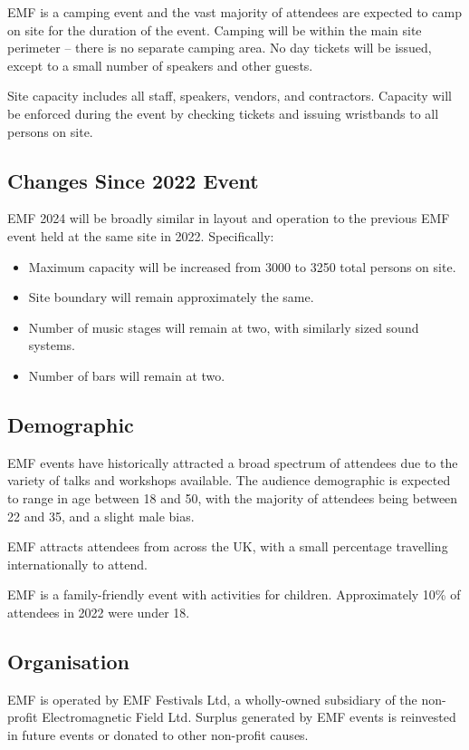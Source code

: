 EMF is a camping event and the vast majority of attendees are expected to camp on site for the duration
of the event. Camping will be within the main site perimeter -- there is no separate camping area.
No day tickets will be issued, except to a small number of speakers and other guests.

Site capacity includes all staff, speakers, vendors, and contractors. Capacity will be enforced during the
event by checking tickets and issuing wristbands to all persons on site.

\subsection{Changes Since 2022 Event}

EMF 2024 will be broadly similar in layout and operation to the previous EMF event held at
the same site in 2022. Specifically:

\begin{itemize}
    \tightlist
    \item Maximum capacity will be increased from 3000 to 3250 total persons on site.
    \item Site boundary will remain approximately the same.
    \item Number of music stages will remain at two, with similarly sized sound systems.
    \item Number of bars will remain at two.
\end{itemize}

\subsection{Demographic}
EMF events have historically attracted a broad spectrum of attendees due to the
variety of talks and workshops available. The audience demographic is expected
to range in age between 18 and 50, with the majority of attendees being between
22 and 35, and a slight male bias.

EMF attracts attendees from across the UK, with a small percentage travelling
internationally to attend.

EMF is a family-friendly event with activities for children. Approximately 10\%
of attendees in 2022 were under 18.

\subsection{Organisation}
EMF is operated by EMF Festivals Ltd, a wholly-owned subsidiary of the non-profit
Electromagnetic Field Ltd. Surplus generated by EMF events is reinvested in future
events or donated to other non-profit causes.

